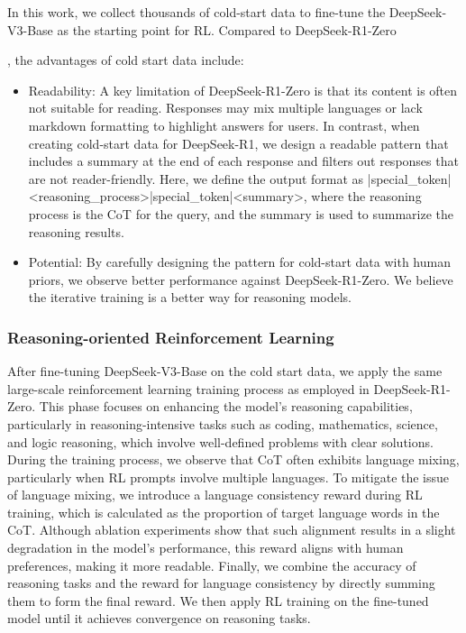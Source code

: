 \documentclass[11pt, a4paper, logo, copyright, nonumbering]{deepseek}
\newcommand{\dsri}{DeepSeek-R1}
\newcommand{\dsro}{DeepSeek-R1-Zero}
\begin{document}
In this work, we collect thousands of cold-start data to fine-tune the DeepSeek-V3-Base as the starting point for RL.
Compared to \dsro{, the advantages of cold start data include:
\begin{itemize}[topsep=0pt]
    \item 
Readability: A key limitation of \dsro{} is that its content is often not suitable for reading. Responses may mix multiple languages or lack markdown formatting to highlight answers for users. In contrast, when creating cold-start data for \dsri{}, we design a readable pattern that includes a summary at the end of each response and filters out responses that are not reader-friendly. Here, we define the output format as |special\_token|<reasoning\_process>|special\_token|<summary>, where the reasoning process is the CoT for the query, and the summary is used to summarize the reasoning results. 

 \item 
Potential: By carefully designing the pattern for cold-start data with human priors, we observe better performance against \dsro{}. We believe the iterative training is a better way for reasoning models. 
\end{itemize}

\subsubsection{Reasoning-oriented Reinforcement Learning}
After fine-tuning DeepSeek-V3-Base on the cold start data, we apply the same large-scale reinforcement learning training process as employed in \dsro. This phase focuses on enhancing the model's reasoning capabilities, particularly in reasoning-intensive tasks such as coding, mathematics, science, and logic reasoning, which involve well-defined problems with clear solutions. During the training process, we observe that CoT often exhibits language mixing, particularly when RL prompts involve multiple languages. To mitigate the issue of language mixing, we introduce a language consistency reward during RL training, which is calculated as the proportion of target language words in the CoT. Although ablation experiments show that such alignment results in a slight degradation in the model's performance, this reward aligns with human preferences, making it more readable. Finally, we combine the accuracy of reasoning tasks and the reward for language consistency by directly summing them to form the final reward. We then apply RL training on the fine-tuned model until it achieves convergence on reasoning tasks.

}
\end{document}
